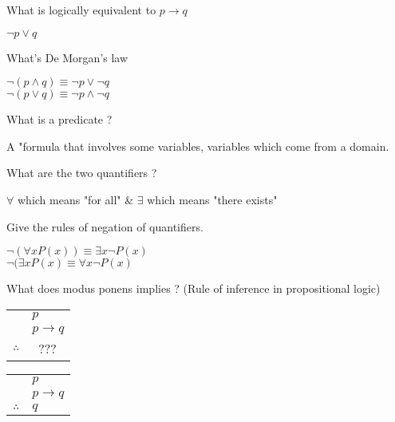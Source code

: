 \documentclass[12pt]{article}
\newcommand*{\xfield}[1]{\begin{mdframed}\centering #1\end{mdframed}\bigskip}
\newenvironment{note}{}{}
\begin{document}
\begin{note}
    \xfield{What is logically equivalent to $p \rightarrow q$}
    \xfield{$\neg p \vee q$}
\end{note}

\begin{note}
    \xfield{What's De Morgan's law}
    \xfield{
        $\neg (p\wedge q) \equiv \neg p \vee \neg q$  \\
        $\neg (p \vee q) \equiv \neg p \wedge \neg q$}
\end{note}

\begin{note}
    \xfield{What is a predicate ?}
    \xfield{A "formula that involves some variables, variables which come from a domain.}
\end{note}

\begin{note}
    \xfield{What are the two quantifiers ?}
    \xfield{$\forall$ which means "for all" \& $\exists$ which means "there exists"}
\end{note}

\begin{note}
    \xfield{Give the rules of negation of quantifiers.}
    \xfield{
        $\neg (\forall x P(x)) \equiv \exists x \neg P(x)$ \\
        $\neg (\exists x P(x) \equiv \forall x \neg P(x)$
    }
\end{note}

\begin{note}
    \xfield{What does modus ponens implies ? (Rule of inference in propositional logic) \begin{tabular}{c@{\,}l@{}}                          & $p$ \\& $p \to q$ \\\cline{2-2}    $\therefore$         & \ ??? \\  \end{tabular}}
    \xfield{
        \begin{tabular}{c@{\,}l@{}} 
                                 & $p$ \\
        & $p \to q$ \\\cline{2-2}
            $\therefore$         & $q$ \\  \end{tabular}
    }
\end{note}
\end{document}
